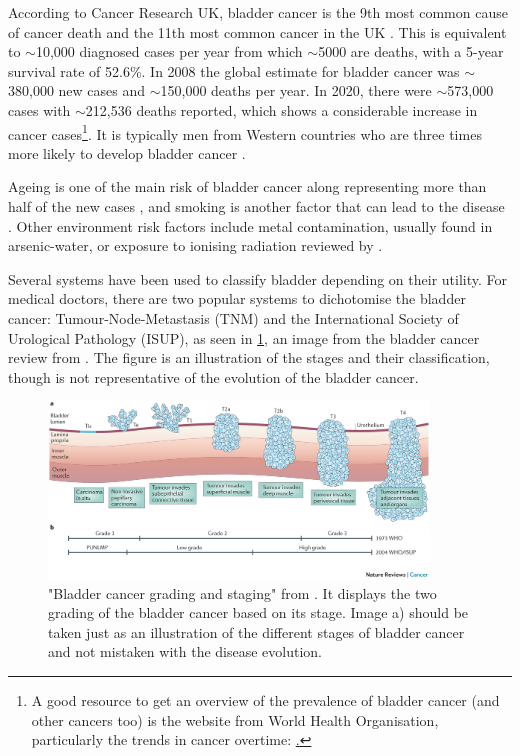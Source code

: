 According to Cancer Research UK, bladder cancer is the 9th most common cause of cancer death and the 11th most common cancer in the UK \cite{Cancer_Research_UK2015-cf}. This is equivalent to $\sim$10,000 diagnosed cases per year from which  $\sim$5000 are deaths, with a 5-year survival rate of 52.6\%. In 2008\cite{Ferlay2010-sx} the global estimate for bladder cancer was $\sim$380,000 new cases and $\sim$150,000 deaths per year. In 2020\cite{Sung2021-hn}, there were $\sim$573,000 cases with $\sim$212,536 deaths reported, which shows a considerable increase in cancer cases\footnote{A good resource to get an overview of the prevalence of bladder cancer (and other cancers too) is the website from World Health Organisation, particularly the trends in cancer overtime: \href{https://gco.iarc.fr/en}.}. It is typically men from Western countries who are three times more likely to develop bladder cancer \cite{Knowles2015-mu}. 

Ageing is one of the main risk of bladder cancer along representing more than half of the new cases \cite{Cancer_Research_UK2015-cf}, and smoking is another factor that can lead to the disease \citep{Knowles2015-mu}. Other environment risk factors include metal contamination, usually found in arsenic-water, or exposure to ionising radiation reviewed by \citep{Knowles2015-mu}. 

Several systems have been used to classify bladder depending on their utility. For medical doctors, there are two popular systems to dichotomise the bladder cancer: Tumour-Node-Metastasis (TNM) and the International Society of Urological Pathology (ISUP), as seen in \cref{fig:lit:bladder_cancer_stages}, an image from the bladder cancer review from \citet{Knowles2015-mu}. The figure is an illustration of the stages and their classification, though is not representative of the evolution of the bladder cancer.

\begin{figure}[!t]    
    \centering
\includegraphics[width=0.9\textwidth,height=0.9\textheight,keepaspectratio]{Sections/Lit_review/Resources/bladder_cancer_grading.jpg}
    \caption{"Bladder cancer grading and staging" from \cite{Knowles2015-mu}. It displays the two grading of the bladder cancer based on its stage. Image a) should be taken just as an illustration of the different stages of bladder cancer and not mistaken with the disease evolution. }
    \label{fig:lit:bladder_cancer_stages}
\end{figure}


